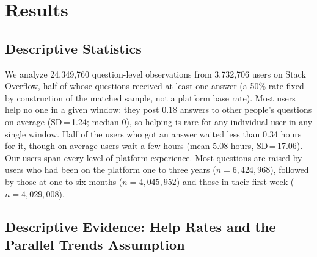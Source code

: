 \section{Results}
\label{sec:results}

\subsection{Descriptive Statistics}

We analyze 24,349,760 question-level observations from 3,732,706 users on Stack Overflow, half of whose questions received at least one answer (a 50\% rate fixed by construction of the matched sample, not a platform base rate). Most users help no one in a given window: they post 0.18 answers to other people's questions on average (SD\,=\,1.24; median 0), so helping is rare for any individual user in any single window. Half of the users who got an answer waited less than 0.34 hours for it, though on average users wait a few hours (mean 5.08 hours, SD\,=\,17.06). Our users span every level of platform experience. Most questions are raised by users who had been on the platform one to three years ($n=6{,}424{,}968$), followed by those at one to six months ($n=4{,}045{,}952$) and those in their first week ($n=4{,}029{,}008$).




\subsection{Descriptive Evidence: Help Rates and the Parallel Trends Assumption}
\label{sec:descriptive_evidence}

